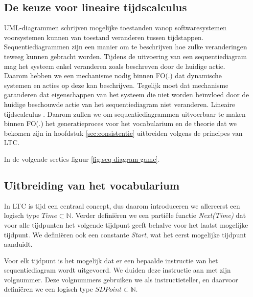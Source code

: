 \DIFaddend \subsection{De keuze voor lineaire tijdscalculus}
UML-diagrammen schrijven mogelijke toestanden van\DIFdelbegin {}\DIFdelend \DIFaddbegin {}\DIFaddend op softwaresystemen voor\DIFdelbegin {}\DIFdelend \DIFaddbegin {}\DIFaddend systemen kunnen van toestand veranderen tussen tijdstappen. Sequentiediagrammen zijn een manier om te beschrijven hoe zulke veranderingen teweeg kunnen gebracht worden. Tijdens de uitvoering van een sequentiediagram mag het systeem enkel veranderen zoals beschreven door de huidige actie. Daarom hebben we een mechanisme nodig binnen FO(.) dat dynamische systemen en acties op deze kan beschrijven. Tegelijk moet dat mechanisme garanderen dat eigenschappen van het systeem die niet worden be\"invloed door de huidige beschouwde actie van het sequentiediagram niet veranderen. Lineaire tijdscalculus\DIFdelbegin %
\DIFdelend \DIFaddbegin {}\DIFaddend . Daarom zullen we om sequentiediagrammen uitvoerbaar te maken binnen FO(.) het generatieproces voor het vocabularium en de theorie dat we bekomen zijn in hoofdstuk \ref{sec:consistentie} uitbreiden volgens de principes van LTC.

In de volgende secties \DIFdelbegin {}\DIFdelend \DIFaddbegin {}\DIFaddend figuur \ref{fig:seq-diagram-game}.

\subsection{Uitbreiding van het vocabularium}
In LTC is tijd een centraal concept, dus daarom introduceren we allereerst een logisch type $Time \subset \mathbb{N}$. Verder defini\"eren we een parti\"ele functie \textit{Next(Time)} dat voor alle tijdpunten het volgende tijdpunt geeft behalve voor het laatst mogelijke tijdpunt. We defini\"eren ook een constante \textit{Start}, wat het eerst mogelijke tijdpunt aanduidt.

Voor elk tijdpunt is het mogelijk dat er een bepaalde instructie van het sequentiediagram wordt uitgevoerd. We duiden deze instructie aan met zijn volgnummer.
Deze volgnummers gebruiken we als instructieteller, en daarvoor defini\"eren we een logisch type $SDPoint \subset \mathbb{N}$.

